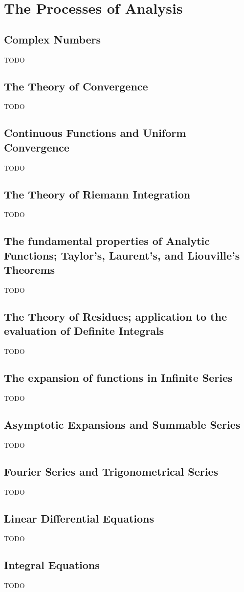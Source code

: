 \documentclass{book}
\numberwithin{equation}{subsection}
\theoremstyle{remark}
\numberwithin{wandwexample}{subsubsection}
\begin{document}
\tableofcontents
\part{The Processes of Analysis}

\chapter{Complex Numbers} TODO
\chapter{The Theory of Convergence} TODO
\chapter{Continuous Functions and Uniform Convergence} TODO
\chapter{The Theory of Riemann Integration} TODO
\chapter{The fundamental properties of Analytic Functions; Taylor's,
Laurent's, and Liouville's Theorems} TODO
\chapter{The Theory of Residues; application
to the evaluation of Definite Integrals} TODO
\chapter{The expansion of functions in Infinite Series} TODO
\chapter{Asymptotic Expansions and Summable Series} TODO
\chapter{Fourier Series and Trigonometrical Series} TODO
\chapter{Linear Differential Equations} TODO
\chapter{Integral Equations} TODO
\end{document}
